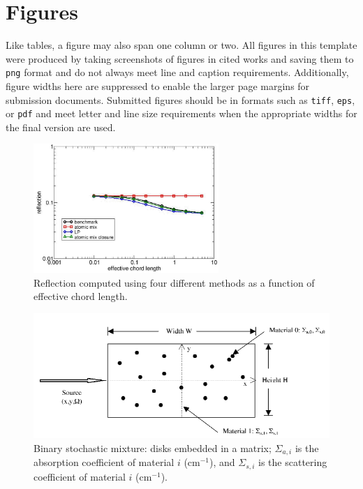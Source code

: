 \documentclass{style/nseJournal}
\begin{document}
\section{Figures}
\label{sec:figures}

Like tables, a figure may also span one column or two.
All figures in this template were produced by taking screenshots of figures in cited works and saving them to \texttt{png} format and do not always meet line and caption requirements.
Additionally, figure widths here are suppressed to enable the larger page margins for submission documents.
Submitted figures should be in formats such as \texttt{tiff}, \texttt{eps}, or \texttt{pdf} and meet letter and line size requirements when the appropriate widths for the final version are used.

\begin{figure}[t]%
  \centering
  \includegraphics[trim = 10mm 0mm 15mm 15mm, width=70mm]{figures/AMClosure.PNG}
  \caption{Reflection computed using four different methods as a function of effective chord length.}
  \label{fig:AMClosure}
\end{figure}

\begin{figure}%
  \centering
  \includegraphics[trim = 10mm 0mm 10mm 0mm, width=140mm]{figures/DonovanFig1.PNG}
  \caption{Binary stochastic mixture: disks embedded in a matrix; $\Sigma_{a,i}$ is the absorption coefficient of material $i$ (cm$^{-1}$), and $\Sigma_{s,i}$ is the scattering coefficient of material $i$ (cm$^{-1}$).}
  \label{fig:DonovanFig1}
\end{figure}
\end{document}
